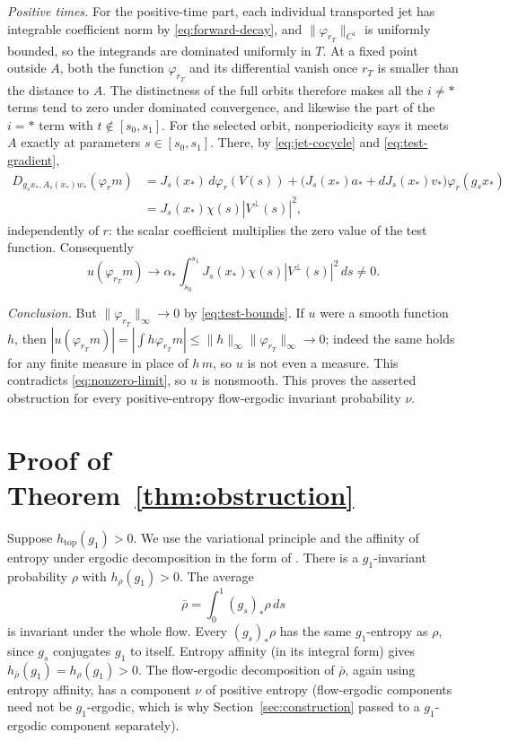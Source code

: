 \documentclass[11pt]{article}
\theoremstyle{remark}
\newcommand{\htop}{h_{\mathrm{top}}}
\begin{document}
\emph{Positive times.}
For the positive-time part, each individual transported jet has
integrable coefficient norm by \eqref{eq:forward-decay}, and
\(\|\varphi_{r_T}\|_{C^1}\) is uniformly bounded, so the integrands
are dominated uniformly in \(T\).
At a fixed point outside \(A\), both the function \(\varphi_{r_T}\)
and its differential vanish once \(r_T\) is smaller than the distance
to \(A\).
The distinctness of the full orbits therefore makes all the
\(i\ne *\) terms tend to zero under dominated convergence, and
likewise the part of the \(i=*\) term with \(t\notin[s_0,s_1]\).
For the selected orbit, nonperiodicity says it meets \(A\)
exactly at parameters \(s\in[s_0,s_1]\).
There, by \eqref{eq:jet-cocycle} and \eqref{eq:test-gradient},
\[
\begin{aligned}
 D_{g_sx_*,A_s(x_*)w_*}(\varphi_{r}m)
 &=J_s(x_*)\,d\varphi_r(V(s))
  +\bigl(J_s(x_*)a_*+dJ_s(x_*)v_*\bigr)\varphi_r(g_sx_*)\\
 &=J_s(x_*)\chi(s)|V^\perp(s)|^2,
\end{aligned}
\]
independently of \(r\): the scalar coefficient multiplies the zero
value of the test function.  Consequently
\begin{equation}\label{eq:nonzero-limit}
 u(\varphi_{r_T}m)\longrightarrow
 \alpha_*\int_{s_0}^{s_1}
        J_s(x_*)\chi(s)|V^\perp(s)|^2\,ds\ne0 .
\end{equation}

\emph{Conclusion.}
But \(\|\varphi_{r_T}\|_\infty\to0\) by \eqref{eq:test-bounds}.
If \(u\) were a smooth function \(h\), then
\(|u(\varphi_{r_T}m)|=|\int h\varphi_{r_T}m|
\le\|h\|_\infty\|\varphi_{r_T}\|_\infty\to0\); indeed the same
holds for any finite measure in place of \(h\,m\), so \(u\) is not
even a measure.  This contradicts \eqref{eq:nonzero-limit}, so
\(u\) is nonsmooth.
This proves the asserted obstruction for every positive-entropy
flow-ergodic invariant probability \(\nu\).

\section{Proof of Theorem~\ref{thm:obstruction}}
\label{sec:conclusion}

Suppose \(\htop(g_1)>0\).  We use the variational principle and the
affinity of entropy under ergodic decomposition in the form of
\cite[Chapter~8]{Walters1982}.
There is a \(g_1\)-invariant probability
\(\rho\) with \(h_\rho(g_1)>0\).
The average
\[
 \bar\rho=\int_0^1(g_s)_*\rho\,ds
\]
is invariant under the whole flow.
Every \((g_s)_*\rho\) has the same \(g_1\)-entropy as \(\rho\),
since \(g_s\) conjugates \(g_1\) to itself.
Entropy affinity (in its integral form) gives
\(h_{\bar\rho}(g_1)=h_\rho(g_1)>0\).
The flow-ergodic decomposition of \(\bar\rho\), again using entropy
affinity, has a component \(\nu\) of positive entropy (flow-ergodic
components need not be \(g_1\)-ergodic, which is why
Section~\ref{sec:construction} passed to a \(g_1\)-ergodic component
separately).
\end{document}
